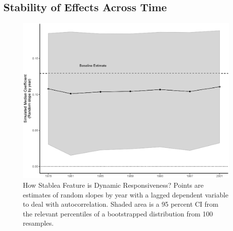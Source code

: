 \documentclass[a4paper,12pt]{article}
\begin{document}
\subsection{Stability of Effects Across Time}
\label{stability}

\begin{figure}[!htb]
	\centering
	\includegraphics[scale = .65]{StabilityOfEffects.eps}
	\caption{How Stablea Feature is Dynamic Responsiveness? Points are estimates of random slopes by year with a lagged dependent variable to deal with autocorrelation. Shaded area is a 95 percent CI from the relevant percentiles of a bootstrapped distribution from 100 resamples.} \label{fig:stab}
\end{figure}



\end{document}
